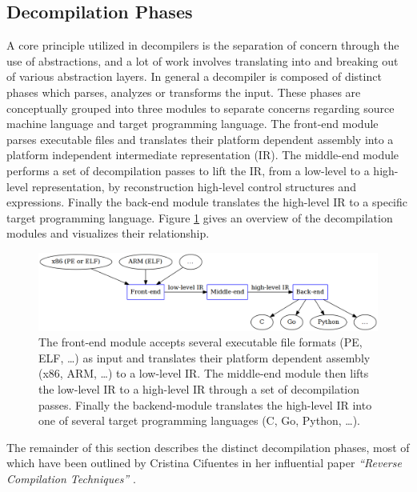 \documentclass[12pt, a4paper]{article}
\begin{document}

\subsection{Decompilation Phases}

A core principle utilized in decompilers is the separation of concern through the use of abstractions, and a lot of work involves translating into and breaking out of various abstraction layers. In general a decompiler is composed of distinct phases which parses, analyzes or transforms the input. These phases are conceptually grouped into three modules to separate concerns regarding source machine language and target programming language. The front-end module parses executable files and translates their platform dependent assembly into a platform independent intermediate representation (IR). The middle-end module performs a set of decompilation passes to lift the IR, from a low-level to a high-level representation, by reconstruction high-level control structures and expressions. Finally the back-end module translates the high-level IR to a specific target programming language. Figure \ref{modules_overview} gives an overview of the decompilation modules and visualizes their relationship.

\begin{figure}[htbp]
	\includegraphics[width=\textwidth]{inc/modules_overview.png}
	\caption{The front-end module accepts several executable file formats (PE, ELF, …) as input and translates their platform dependent assembly (x86, ARM, …) to a low-level IR. The middle-end module then lifts the low-level IR to a high-level IR through a set of decompilation passes. Finally the backend-module translates the high-level IR into one of several target programming languages (C, Go, Python, …).}
	\label{modules_overview}
\end{figure}

The remainder of this section describes the distinct decompilation phases, most of which have been outlined by Cristina Cifuentes in her influential paper \textit{``Reverse Compilation Techniques''} \cite{rev_comp}.
\end{document}
